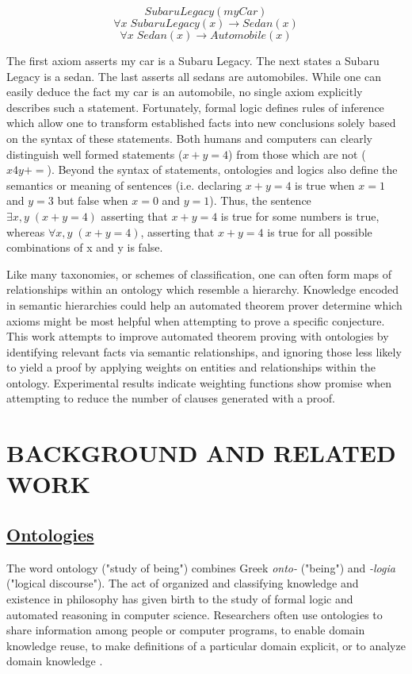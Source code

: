 \documentclass{article}
\begin{document}
\begin{singlespace}
\[SubaruLegacy(myCar)\]
\[\forall x \; SubaruLegacy(x) \rightarrow Sedan(x)\]
\[\forall x \; Sedan(x) \rightarrow Automobile(x)\]
\end{singlespace}

The first axiom asserts my car is a Subaru Legacy. The next states a Subaru Legacy is a sedan. The last asserts all sedans are automobiles. While one can easily deduce the fact my car is an automobile, no single axiom explicitly describes such a statement. Fortunately, formal logic defines rules of inference which allow one to transform established facts into new conclusions solely based on the syntax of these statements. Both humans and computers can clearly distinguish well formed statements ($x+y=4$) from those which are not ($x4y+=$). Beyond the syntax of statements, ontologies and logics also define the semantics or meaning of sentences (i.e. declaring $x+y=4$ is true when $x=1$ and $y=3$ but false when $x=0$ and $y=1$). Thus, the sentence $\exists x, y \; (x+y =4)$ asserting that $x+y=4$ is true for some numbers is true, whereas $\forall x, y \; (x+y = 4)$, asserting that $x+y =4$ is true for all possible combinations of x and y is false.

Like many taxonomies, or schemes of classification, one can often form maps of relationships within an ontology which resemble a hierarchy. Knowledge encoded in semantic hierarchies could help an automated theorem prover determine which axioms might be most helpful when attempting to prove a specific conjecture. This work attempts to improve automated theorem proving with ontologies by identifying relevant facts via semantic relationships, and ignoring those less likely to yield a proof by applying weights on entities and relationships within the ontology. Experimental results indicate weighting functions show promise when attempting to reduce the number of clauses generated with a proof. 

\newpage
\vspace*{.05in}
\section{\MakeUppercase{Background and Related Work}}


\subsection{\underline{Ontologies}}

 The word ontology ("study of being") combines Greek \textit{onto-} ("being") and \textit{-logia} ("logical discourse"). The act of organized and classifying knowledge and existence in philosophy has given birth to the study of formal logic and automated reasoning in computer science. Researchers often use ontologies to share information among people or computer programs, to enable domain knowledge reuse, to make definitions of a particular domain explicit, or to analyze domain knowledge \cite{noy2001ontology}.
 
\end{document}
